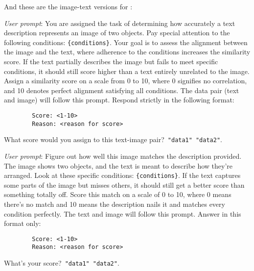 And these are the image-text versions for \mmscorewuimgtext:

\begin{tcolorbox}[enhanced,attach boxed title to top center={yshift=-3mm,yshifttext=-1mm},
  colback=green!5!white,colframe=green!20!gray,colbacktitle=green!20!gray,
  title=Image-Text Prompt Template V1,fonttitle=\bfseries,
  boxed title style={size=small,colframe=green!20!gray} ]

        \emph{User prompt}: You are assigned the task of determining how accurately a text description represents an image of two objects. Pay special attention to the following conditions: \texttt{\{conditions\}}. Your goal is to assess the alignment between the image and the text, where adherence to the conditions increases the similarity score. If the text partially describes the image but fails to meet specific conditions, it should still score higher than a text entirely unrelated to the image. Assign a similarity score on a scale from 0 to 10, where 0 signifies no correlation, and 10 denotes perfect alignment satisfying all conditions. The data pair (text and image) will follow this prompt. Respond strictly in the following format:
        
        \begin{verbatim}
        Score: <1-10>
        Reason: <reason for score>
        \end{verbatim}
        
        What score would you assign to this text-image pair?\
        \texttt{"data1"}\
        \texttt{"data2"}.\
        
\end{tcolorbox}

\begin{tcolorbox}[enhanced,attach boxed title to top center={yshift=-3mm,yshifttext=-1mm},
  colback=green!5!white,colframe=green!20!gray,colbacktitle=green!20!gray,
  title=Image-Text Prompt Template V2,fonttitle=\bfseries,
  boxed title style={size=small,colframe=green!20!gray} ]

        \emph{User prompt}: Figure out how well this image matches the description provided. The image shows two objects, and the text is meant to describe how they're arranged. Look at these specific conditions: \texttt{\{conditions\}}. If the text captures some parts of the image but misses others, it should still get a better score than something totally off. Score this match on a scale of 0 to 10, where 0 means there's no match and 10 means the description nails it and matches every condition perfectly. The text and image will follow this prompt. Answer in this format only:
        
        \begin{verbatim}
        Score: <1-10>
        Reason: <reason for score>
        \end{verbatim}
        
        What's your score?\
        \texttt{"data1"}\
        \texttt{"data2"}.\
        
\end{tcolorbox}

